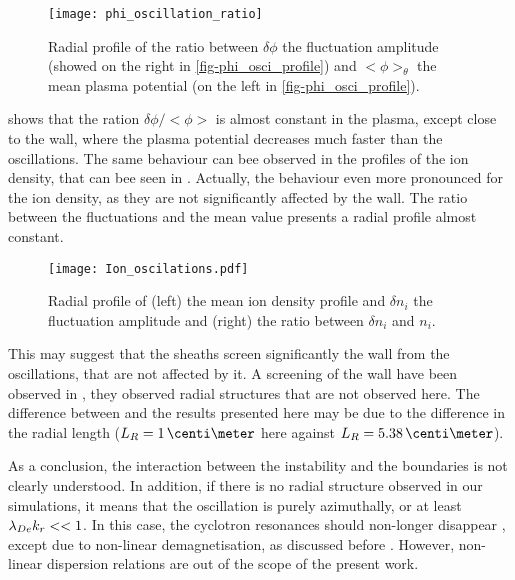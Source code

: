   \begin{figure}[hbtp]
    \centering
    \texttt{[image: phi\_oscillation\_ratio]}
    \caption{Radial profile of the ratio between $\delta \phi$ the fluctuation amplitude (showed on the right in \cref{fig-phi_osci_profile}) and $<\phi>_{\theta}$  the mean plasma potential (on the left in \cref{fig-phi_osci_profile}).}
    \label{fig-ratio}
  \end{figure}
  
   shows that the ration $\delta \phi / <\phi>$ is almost constant in the plasma, except close to the wall, where the plasma potential decreases much faster than the oscillations.
  The same behaviour can bee observed in the profiles of the ion density, that can bee seen in .
  Actually, the behaviour even more pronounced for the ion density, as they are not significantly affected by the wall.
  The ratio between the fluctuations and the mean value presents a radial profile almost constant.
  
  \begin{figure}[hbtp]
    \centering
    \texttt{[image: Ion\_oscilations.pdf]}
    \caption{Radial profile of (left) the mean ion density profile and $\delta n_i$ the fluctuation amplitude and (right) the ratio between $\delta n_i$ and $n_i$.}
    \label{fig-ion_oscilation}
  \end{figure}
  
  \vspace{1em}
  This may suggest that the sheaths screen significantly the wall from the oscillations, that are not affected by it.
  A screening of the wall have been observed in \citet{janhunen2018}, they observed radial structures that are not observed here.
  The difference between  \citet{janhunen2018} and the results presented here may be due to the difference in the radial length ($L_R =1 \,\centi\meter$ here against $L_R = 5.38\,\centi\meter$).
  
  As a conclusion, the interaction between the instability and the boundaries is not clearly understood.
  In addition, if there is no radial structure observed in our simulations, it means that the oscillation is purely azimuthally, or at least $\lambda_{De} k_r <<1$.
  In this case, the cyclotron resonances should non-longer disappear \citep{ducrocq2006}, except due to non-linear demagnetisation, as discussed before \citep{boeuf2018,taccogna2019}.
  However, non-linear dispersion relations are out of the scope of the present work.
  
